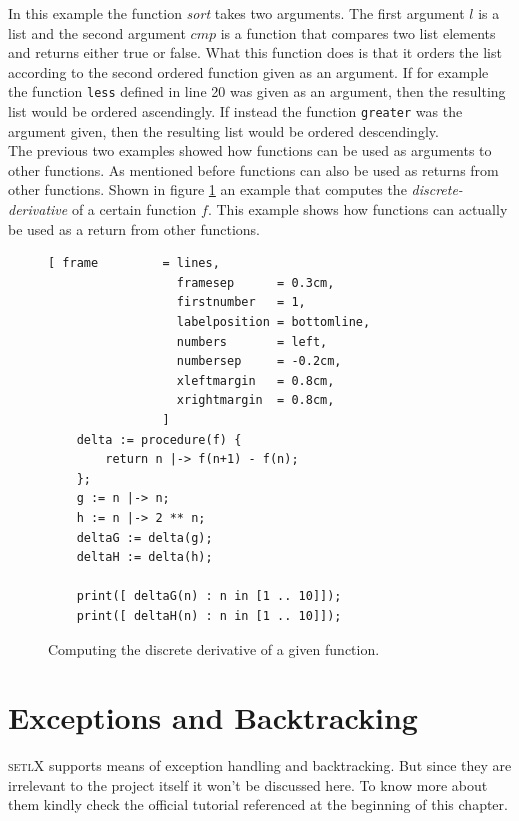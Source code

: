 \documentclass[11pt]{report}
\begin{document}
In this example the function \textsl{sort} takes two arguments. The first argument $l$ is a list and the second argument $cmp$ is a function that compares two list elements and returns either true or false. What this function does is that it orders the list according to the second ordered function given as an argument. If for example the function \texttt{less} defined in line 20 was given as an argument, then the resulting list would be ordered ascendingly. If instead the function \texttt{greater} was the argument given, then the resulting list would be ordered descendingly.
\\

The previous two examples showed how functions can be used as arguments to other functions. As mentioned before functions can also be used as returns from other functions. Shown in figure \ref{fig:finite-difference.stlx} an example that computes the \textsl{discrete-derivative} of a certain function $f$. This example shows how functions can actually be used as a return from other functions.

\begin{figure}[!ht]
\centering
\begin{Verbatim}[ frame         = lines, 
                  framesep      = 0.3cm, 
                  firstnumber   = 1,
                  labelposition = bottomline,
                  numbers       = left,
                  numbersep     = -0.2cm,
                  xleftmargin   = 0.8cm,
                  xrightmargin  = 0.8cm,
                ]
    delta := procedure(f) {
        return n |-> f(n+1) - f(n);
    };    
    g := n |-> n;
    h := n |-> 2 ** n;
    deltaG := delta(g);
    deltaH := delta(h);
    
    print([ deltaG(n) : n in [1 .. 10]]);
    print([ deltaH(n) : n in [1 .. 10]]);
\end{Verbatim}
\vspace*{-0.3cm}
\caption{Computing the discrete derivative of a given function.}
\label{fig:finite-difference.stlx}
\end{figure}
\pagebreak

\section{Exceptions and Backtracking}

\textsc{setlX} supports means of exception handling and backtracking. But since they are irrelevant to the project itself it won't be discussed here. To know more about them kindly check the official tutorial referenced at the beginning of this chapter. 
\end{document}
